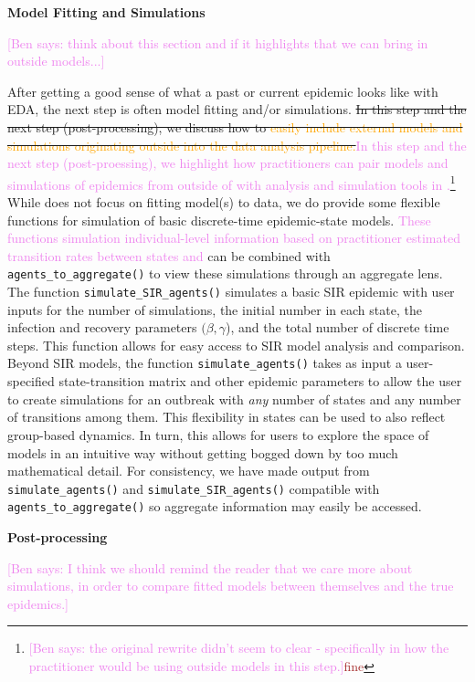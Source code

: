 \documentclass[
  shortnames]{jss}
\begin{document}
\textbf{Model Fitting and Simulations}

\textcolor{violet}{[Ben says: think about this section and if it highlights that we can bring in outside models...]}

After getting a good sense of what a past or current epidemic looks like
with EDA, the next step is often model fitting and/or simulations.
\sout{In this step and the next step (post-processing), we discuss how to \textcolor{orange}{easily include external models and simulations originating outside into the  data analysis pipeline.}}\textcolor{violet}{In this step and the next step (post-proessing), we highlight how practitioners can pair models and simulations of epidemics from outside of  with analysis and simulation tools in .}\footnote{\textcolor{violet}{[Ben says: the original rewrite didn't seem to clear - specifically in how the practitioner would be using outside models in this step.]}\textcolor{brown}{fine}}
While  does not focus on fitting model(s) to data, we do
provide some flexible functions for simulation of basic discrete-time
epidemic-state models.
\textcolor{violet}{These functions simulation individual-level information based on practitioner estimated transition rates between states and}
can be combined with \texttt{agents\_to\_aggregate()} to view these
simulations through an aggregate lens. The function
\texttt{simulate\_SIR\_agents()} simulates a basic SIR epidemic with
user inputs for the number of simulations, the initial number in each
state, the infection and recovery parameters \((\beta, \gamma\)), and
the total number of discrete time steps. This function allows for easy
access to SIR model analysis and comparison. Beyond SIR models, the
function \texttt{simulate\_agents()} takes as input a user-specified
state-transition matrix and other epidemic parameters to allow the user
to create simulations for an outbreak with \textit{any} number of states
and any number of transitions among them. This flexibility in states can
be used to also reflect group-based dynamics. In turn, this allows for
users to explore the space of models in an intuitive way without getting
bogged down by too much mathematical detail. For consistency, we have
made output from \texttt{simulate\_agents()} and
\texttt{simulate\_SIR\_agents()} compatible with
\texttt{agents\_to\_aggregate()} so aggregate information may easily be
accessed.

\textbf{Post-processing}

\textcolor{violet}{[Ben says: I think we should remind the reader that we care more about simulations, in order to compare fitted models between themselves and the true epidemics.]}
\end{document}
